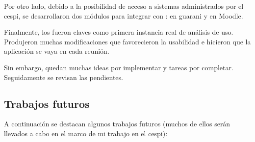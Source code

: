 Por otro lado, debido a la posibilidad de acceso a sistemas administrados por el \gls{cespi}, se desarrollaron dos módulos para integrar con \nombreApp{}: en \gls{guarani} y en Moodle.

Finalmente, los  fueron claves como primera instancia real de análisis de uso. Produjeron muchas modificaciones que favorecieron la usabilidad e hicieron que la aplicación se vaya  en cada reunión.

Sin embargo, quedan muchas ideas por implementar y tareas por completar. Seguidamente se revisan las pendientes.

\subsection{Trabajos futuros}
\label{trabajos_futuros}

A continuación se destacan algunos trabajos futuros (muchos de ellos serán llevados a cabo en el marco de mi trabajo en el \gls{cespi}):

